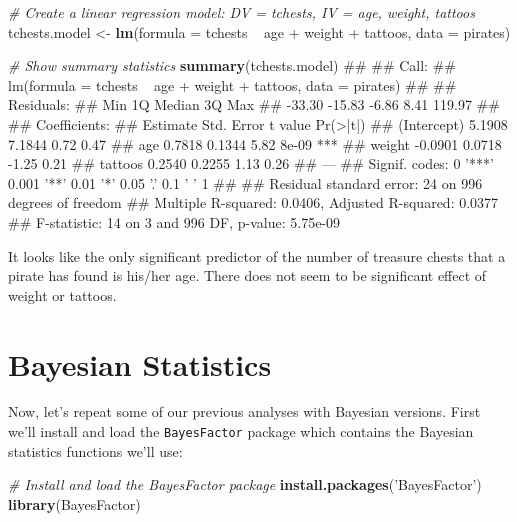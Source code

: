 \documentclass[]{book}
\newenvironment{Shaded}{\begin{snugshade}}{\end{snugshade}}
\newcommand{\KeywordTok}[1]{\textcolor[rgb]{0.13,0.29,0.53}{\textbf{{#1}}}}
\newcommand{\DataTypeTok}[1]{\textcolor[rgb]{0.13,0.29,0.53}{{#1}}}
\newcommand{\StringTok}[1]{\textcolor[rgb]{0.31,0.60,0.02}{{#1}}}
\newcommand{\CommentTok}[1]{\textcolor[rgb]{0.56,0.35,0.01}{\textit{{#1}}}}
\newcommand{\NormalTok}[1]{{#1}}
\theoremstyle{definition}
\theoremstyle{definition}
\theoremstyle{remark}
\begin{document}
\begin{Shaded}
\begin{Highlighting}[]
\CommentTok{# Create a linear regression model: DV = tchests, IV = age, weight, tattoos}
\NormalTok{tchests.model <-}\StringTok{ }\KeywordTok{lm}\NormalTok{(}\DataTypeTok{formula =} \NormalTok{tchests ~}\StringTok{ }\NormalTok{age +}\StringTok{ }\NormalTok{weight +}\StringTok{ }\NormalTok{tattoos,}
                    \DataTypeTok{data =} \NormalTok{pirates)}

\CommentTok{# Show summary statistics}
\KeywordTok{summary}\NormalTok{(tchests.model)}
\NormalTok{## }
\NormalTok{## Call:}
\NormalTok{## lm(formula = tchests ~ age + weight + tattoos, data = pirates)}
\NormalTok{## }
\NormalTok{## Residuals:}
\NormalTok{##    Min     1Q Median     3Q    Max }
\NormalTok{## -33.30 -15.83  -6.86   8.41 119.97 }
\NormalTok{## }
\NormalTok{## Coefficients:}
\NormalTok{##             Estimate Std. Error t value Pr(>|t|)    }
\NormalTok{## (Intercept)   5.1908     7.1844    0.72     0.47    }
\NormalTok{## age           0.7818     0.1344    5.82    8e-09 ***}
\NormalTok{## weight       -0.0901     0.0718   -1.25     0.21    }
\NormalTok{## tattoos       0.2540     0.2255    1.13     0.26    }
\NormalTok{## ---}
\NormalTok{## Signif. codes:  0 '***' 0.001 '**' 0.01 '*' 0.05 '.' 0.1 ' ' 1}
\NormalTok{## }
\NormalTok{## Residual standard error: 24 on 996 degrees of freedom}
\NormalTok{## Multiple R-squared:  0.0406, Adjusted R-squared:  0.0377 }
\NormalTok{## F-statistic:   14 on 3 and 996 DF,  p-value: 5.75e-09}
\end{Highlighting}
\end{Shaded}

It looks like the only significant predictor of the number of treasure
chests that a pirate has found is his/her age. There does not seem to be
significant effect of weight or tattoos.

\section{Bayesian Statistics}\label{bayesian-statistics}

Now, let's repeat some of our previous analyses with Bayesian versions.
First we'll install and load the \texttt{BayesFactor} package which
contains the Bayesian statistics functions we'll use:

\begin{Shaded}
\begin{Highlighting}[]
\CommentTok{# Install and load the BayesFactor package}
\KeywordTok{install.packages}\NormalTok{(}\StringTok{'BayesFactor'}\NormalTok{)}
\KeywordTok{library}\NormalTok{(BayesFactor)}
\end{Highlighting}
\end{Shaded}
\end{document}
